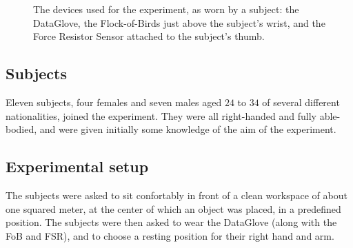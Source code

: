 \begin{figure}[htbp]
  \begin{center}
    \caption{The devices used for the experiment, as worn by a
    subject: the DataGlove, the Flock-of-Birds just above the
    subject's wrist, and the Force Resistor Sensor attached to the
    subject's thumb.}
    \label{fig:devices}
  \end{center}
\end{figure}

\subsection*{Subjects}

Eleven subjects, four females and seven males aged $24$ to $34$ of
several different nationalities, joined the experiment. They were all
right-handed and fully able-bodied, and were given initially some
knowledge of the aim of the experiment.

\subsection*{Experimental setup}

The subjects were asked to sit confortably in front of a clean
workspace of about one squared meter, at the center of which an object
was placed, in a predefined position. The subjects were then asked to
wear the DataGlove (along with the FoB and FSR), and to choose a
resting position for their right hand and arm.

